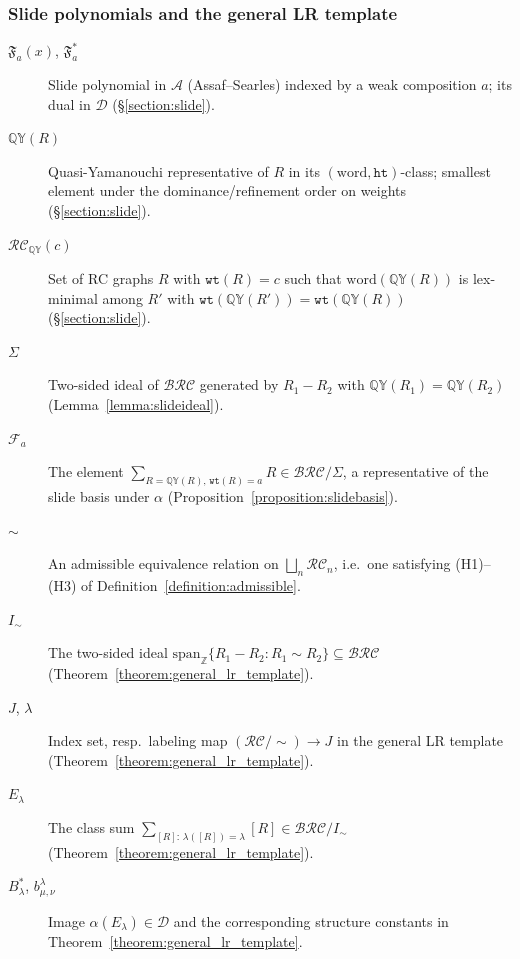 \documentclass{amsart}
\theoremstyle{definition}
\theoremstyle{remark}
\numberwithin{equation}{subsection}
\newcommand{\wtt}{\mathtt{wt}}
\newcommand{\QY}{\ensuremath{\mathbb{QY}}}
\newcommand{\hr}{\mathtt{ht}}
\newcommand{\BRC}{\mathcal{BRC}}
\newcommand{\RC}{\mathcal{RC}}
\newcommand{\coma}{\mathcal{A}}
\newcommand{\dcoma}{\mathcal{D}}
\begin{document}
\subsubsection*{Slide polynomials and the general LR template}
\begin{description}
\item[$\mathfrak{F}_a(x)$, $\mathfrak{F}_a^*$] Slide polynomial in $\coma$ (Assaf--Searles) indexed by a weak composition $a$; its dual in $\dcoma$ (\S\ref{section:slide}).
\item[$\QY(R)$] Quasi-Yamanouchi representative of $R$ in its $(\mathrm{word},\hr)$-class; smallest element under the dominance/refinement order on weights (\S\ref{section:slide}).
\item[$\RC_\QY(c)$] Set of RC graphs $R$ with $\wtt(R)=c$ such that $\mathrm{word}(\QY(R))$ is lex-minimal among $R'$ with $\wtt(\QY(R'))=\wtt(\QY(R))$ (\S\ref{section:slide}).
\item[$\Sigma$] Two-sided ideal of $\BRC$ generated by $R_1-R_2$ with $\QY(R_1)=\QY(R_2)$ (Lemma~\ref{lemma:slideideal}).
\item[$\mathcal{F}_a$] The element $\sum_{R=\QY(R),\,\wtt(R)=a} R\in\BRC/\Sigma$, a representative of the slide basis under $\alpha$ (Proposition~\ref{proposition:slidebasis}).
\item[$\sim$] An admissible equivalence relation on $\bigsqcup_n\RC_n$, i.e.\ one satisfying (H1)--(H3) of Definition~\ref{definition:admissible}.
\item[$I_\sim$] The two-sided ideal $\mathrm{span}_{\mathbb{Z}}\{R_1-R_2:R_1\sim R_2\}\subseteq\BRC$ (Theorem~\ref{theorem:general_lr_template}).
\item[$J$, $\lambda$] Index set, resp.\ labeling map $(\RC/\!\sim)\to J$ in the general LR template (Theorem~\ref{theorem:general_lr_template}).
\item[$E_\lambda$] The class sum $\sum_{[R]:\,\lambda([R])=\lambda}[R]\in\BRC/I_\sim$ (Theorem~\ref{theorem:general_lr_template}).
\item[$B_\lambda^*$, $b_{\mu,\nu}^\lambda$] Image $\alpha(E_\lambda)\in\dcoma$ and the corresponding structure constants in Theorem~\ref{theorem:general_lr_template}.
\end{description}
\end{document}
